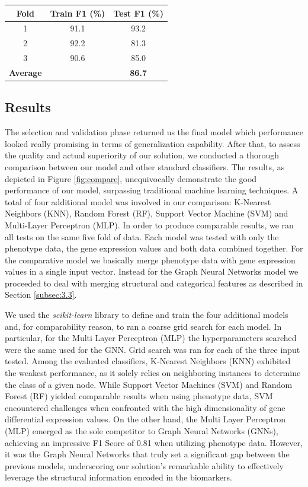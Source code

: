 \documentclass{article}
\begin{document}
\begin{multicols}{2}
\begin{center}
\begin{tabular}{ |c|c c|}
\hline
\textbf{Fold} & \textbf{Train F1 (\%)} & \textbf{Test F1 (\%)}\\
\hline
    1 & 91.1 & 93.2 \\
    2 & 92.2 & 81.3 \\
    3 & 90.6 & 85.0 \\
    \hline
    \rowcolor{LightCyan}
    \textbf{Average} & & \textbf{86.7} \\
\hline
\end{tabular}
\label{table:results}
\end{center}


\subsection{Results}
The selection and validation phase returned us the final model which performance looked really promising in terms of generalization capability. After that, to assess the quality and actual superiority of our solution, we conducted a thorough comparison between our model and other standard classifiers. The results, as depicted in Figure \ref{fig:compare}, unequivocally demonstrate the good performance of our model, surpassing traditional machine learning techniques. A total of four additional model was involved in our comparison: K-Nearest Neighbors (KNN), Random Forest (RF), Support Vector Machine (SVM) and Multi-Layer Perceptron (MLP). In order to produce comparable results, we ran all tests on the same five fold of data. Each model was tested with only the phenotype data, the gene expression values and both data combined together. For the comparative model we basically merge phenotype data with gene expression values in a single input vector. Instead for the Graph Neural Networks model we proceeded to deal with merging structural and categorical features as described in Section \ref{subsec:3.3}.

We used the \textit{scikit-learn} library to define and train the four additional models and, for comparability reason, to ran a coarse grid search for each model. In particular, for the Multi Layer Perceptron (MLP) the hyperparameters searched were the same used for the GNN. Grid search was ran for each of the three input tested.
Among the evaluated classifiers, K-Nearest Neighbors (KNN) exhibited the weakest performance, as it solely relies on neighboring instances to determine the class of a given node. While Support Vector Machines (SVM) and Random Forest (RF) yielded comparable results when using phenotype data, SVM encountered challenges when confronted with the high dimensionality of gene differential expression values. On the other hand, the Multi Layer Perceptron (MLP) emerged as the sole competitor to Graph Neural Networks (GNNs), achieving an impressive F1 Score of 0.81 when utilizing phenotype data. However, it was the Graph Neural Networks that truly set a significant gap between the previous models, underscoring our solution's remarkable ability to effectively leverage the structural information encoded in the biomarkers.


\end{multicols}
\end{document}
